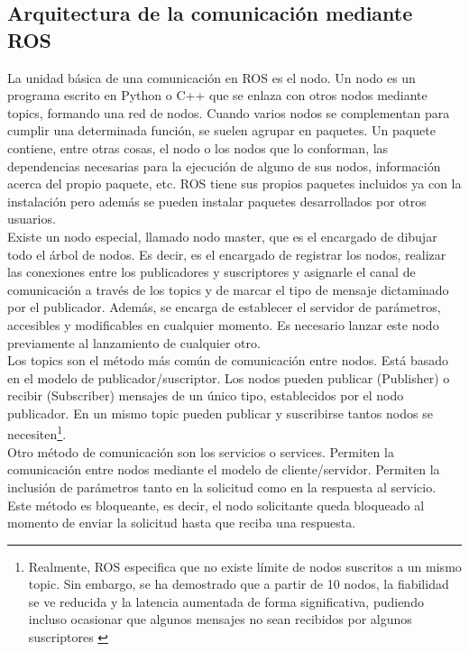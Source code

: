 
\subsection{Arquitectura de la comunicación mediante ROS}

La unidad básica de una comunicación en ROS es el nodo. Un nodo es un programa escrito en Python o C++ que se enlaza con otros nodos mediante topics, formando una red de nodos. Cuando varios nodos se complementan para cumplir una determinada función, se suelen agrupar en paquetes. Un paquete contiene, entre otras cosas, el nodo o los nodos que lo conforman, las dependencias necesarias para la ejecución de alguno de sus nodos, información acerca del propio paquete, etc. ROS tiene sus propios paquetes incluidos ya con la instalación pero además se pueden instalar paquetes desarrollados por otros usuarios.\\

Existe un nodo especial, llamado nodo master, que es el encargado de dibujar todo el árbol de nodos. Es decir, es el encargado de registrar los nodos, realizar las conexiones entre los publicadores y suscriptores y asignarle el canal de comunicación a través de los topics y de marcar el tipo de mensaje dictaminado por el publicador. Además, se encarga de establecer el servidor de parámetros, accesibles y modificables en cualquier momento. Es necesario lanzar este nodo previamente al lanzamiento de cualquier otro. \\

Los topics son el método más común de comunicación entre nodos. Está basado en el modelo de publicador/suscriptor. Los nodos pueden publicar (Publisher) o recibir (Subscriber) mensajes de un único tipo, establecidos por el nodo publicador. En un mismo topic pueden publicar y suscribirse tantos nodos se necesiten\footnote{Realmente, ROS especifica que no existe límite de nodos suscritos a un mismo topic. Sin embargo, se ha demostrado que a partir de 10 nodos, la fiabilidad se ve reducida y la latencia aumentada de forma significativa, pudiendo incluso ocasionar que algunos mensajes no sean recibidos por algunos suscriptores \cite{issue}}. \\

Otro método de comunicación son los servicios o services. Permiten la comunicación entre nodos mediante el modelo de cliente/servidor. Permiten la inclusión de parámetros tanto en la solicitud como en la respuesta al servicio. Este método es bloqueante, es decir, el nodo solicitante queda bloqueado al momento de enviar la solicitud hasta que reciba una respuesta.\\

